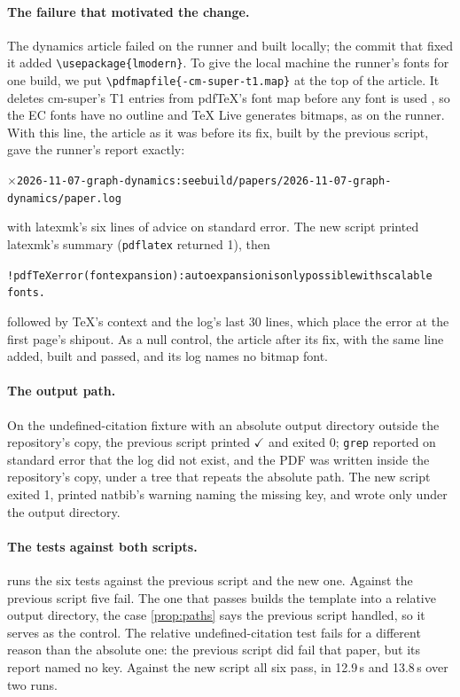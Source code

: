 \documentclass[11pt]{article}
\theoremstyle{plain}
\theoremstyle{definition}
\newcommand{\code}[1]{\texttt{#1}}
\newcommand{\pass}{\(\checkmark\)}
\newcommand{\fail}{\(\times\)}
\begin{document}
\paragraph{The failure that motivated the change.} The dynamics article failed on the runner and
built locally; the commit that fixed it added \code{\textbackslash usepackage\{lmodern\}}. To give
the local machine the runner's fonts for one build, we put
\code{\textbackslash pdfmapfile\{-cm-super-t1.map\}} at the top of the article. It deletes
cm-super's T1 entries from pdfTeX's font map before any font is used \cite{pdftexmanual}, so the EC
fonts have no outline and TeX Live generates bitmaps, as on the runner. With this line, the article
as it was before its fix, built by the previous script, gave the runner's report exactly:
\begin{small}
\begin{alltt}
\fail{} 2026-11-07-graph-dynamics: see build/papers/2026-11-07-graph-dynamics/paper.log
\end{alltt}
\end{small}
with latexmk's six lines of advice on standard error. The new script printed latexmk's summary
(\code{pdflatex} returned 1), then
\begin{small}
\begin{alltt}
! pdfTeX error (font expansion): auto expansion is only possible with scalable
fonts.
\end{alltt}
\end{small}
followed by TeX's context and the log's last 30 lines, which place the error at the first page's
shipout. As a null control, the article after its fix, with the same line added, built and passed,
and its log names no bitmap font.

\paragraph{The output path.} On the undefined-citation fixture with an absolute output directory
outside the repository's copy, the previous script printed \pass{} and exited 0; \code{grep}
reported on standard error that the log did not exist, and the PDF was written inside the
repository's copy, under a tree that repeats the absolute path. The new script exited 1, printed
natbib's warning naming the missing key, and wrote only under the output directory.

\paragraph{The tests against both scripts.}  runs the six tests against the
previous script and the new one. Against the previous script five fail. The one that passes builds
the template into a relative output directory, the case \cref{prop:paths} says the previous script
handled, so it serves as the control. The relative undefined-citation test fails for a different
reason than the absolute one: the previous script did fail that paper, but its report named no
key. Against the new script all six pass, in 12.9\,s and 13.8\,s over two runs.
\end{document}
